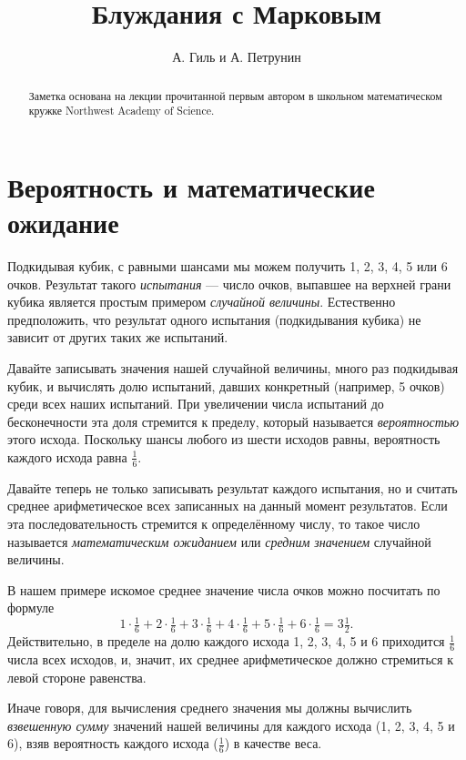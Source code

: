 \documentclass{article}
\begin{document}
\title{Блуждания с Марковым}
\author{А. Гиль и А. Петрунин}
\date{}
\maketitle
\begin{abstract}
Заметка основана на лекции прочитанной первым автором в школьном 
математическом кружке Northwest Academy of Science.
\end{abstract}

\section{Вероятность и математические ожидание}

Подкидывая кубик,
с равными шансами мы можем получить 1, 2, 3, 4, 5 или 6 очков.
Результат такого \emph{испытания} --- число очков, выпавшее на 
верхней грани кубика является простым примером \emph{случайной величины}.
Естественно предположить, что результат одного испытания (подкидывания кубика)
не зависит от других таких же испытаний.


Давайте записывать значения нашей случайной величины, много раз подкидывая кубик,
и вычислять долю испытаний, давших конкретный (например, 5 очков) среди всех наших испытаний.
При увеличении числа испытаний до бесконечности эта доля стремится к пределу, 
который называется \emph{вероятностью} этого исхода.
Поскольку шансы любого из шести исходов равны, вероятность каждого исхода равна $\tfrac16$.

Давайте теперь не только записывать результат каждого испытания, но и считать среднее
арифметическое всех записанных на данный момент результатов. Если эта последовательность стремится к
определённому числу, то такое число называется \emph{математическим ожиданием} или \emph{средним значением}
случайной величины.

В нашем примере искомое среднее значение 
числа очков можно посчитать по формуле
\[1\cdot\tfrac16+2\cdot\tfrac16+3\cdot\tfrac16+4\cdot\tfrac16+5\cdot\tfrac16+6\cdot\tfrac16=3\tfrac12.\]
Действительно, в пределе на долю каждого исхода 1, 2, 3, 4, 5 и 6
приходится $\tfrac16$ числа всех исходов, и, значит, их среднее арифметическое должно 
стремиться к левой стороне равенства.

Иначе говоря, для вычисления среднего значения мы должны вычислить \emph{взвешенную сумму} значений нашей величины
для каждого исхода (1, 2, 3, 4, 5 и 6), взяв вероятность каждого исхода ($\tfrac16$) в качестве веса.
\end{document}
